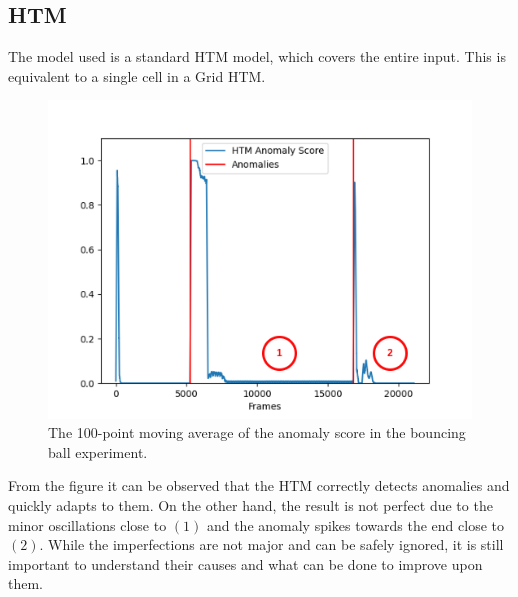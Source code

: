 \subsection{HTM}
The model used is a standard HTM model, which covers the entire input. This is equivalent to a single cell in a Grid HTM.
\begin{figure}[H]
    \centering
    \includegraphics[width=\textwidth]{resources/experiments/bouncing_ball/bb_anoms_bad.png}
    \caption{The 100-point moving average of the anomaly score in the bouncing ball experiment.}
\end{figure}
From the figure it can be observed that the HTM correctly detects anomalies and quickly adapts to them. On the other hand, the result is not perfect due to the minor oscillations close to $(1)$ and the anomaly spikes towards the end close to $(2)$. While the imperfections are not major and can be safely ignored, it is still important to understand their causes and what can be done to improve upon them. \par
